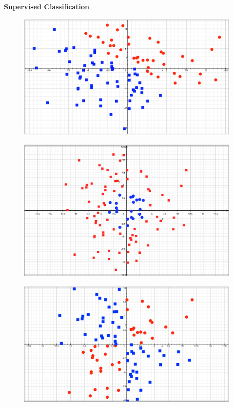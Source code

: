 \documentclass{amsart}
\begin{document}
\begin{center}
	\textbf{Supervised Classification}
\end{center}

\begin{figure}[h!]
\caption{}
\includegraphics[width=\textwidth]{plane.png}	
\end{figure}
\vfill

\begin{figure}[h!]
\caption{}
\includegraphics[width=\textwidth]{parabola.png}
\end{figure}

\pagebreak

\begin{figure}
\caption{}
\includegraphics[width=\textwidth]{saddle.png}
\end{figure}
\vfill
\end{document}
